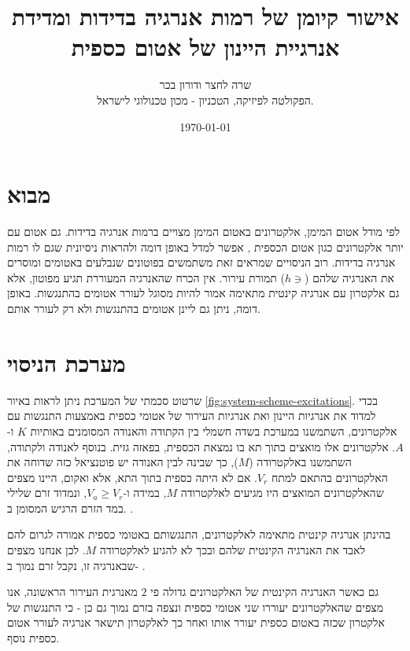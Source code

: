 \documentclass{article}
\title{
אישור קיומן של רמות אנרגיה בדידות ומדידת אנרגיית היינון של אטום כספית
}
\author{
שרה לחצר ודורון בכר \\
הפקולטה לפיזיקה, הטכניון - מכון טכנולוגי לישראל.
}
\date{\today}
\newcommand*\circled[1]{\tikz[baseline=(char.base)]{
		            \node[shape=circle,draw,inner sep=1pt] (char) {#1};}}
\begin{document}
\maketitle

\begin{abstract}
\end{abstract}

\section{מבוא}

לפי מודל אטום המימן, אלקטרונים באטום המימן מצויים ברמות אנרגיה בדידות. גם אטום
עם יותר אלקטרונים כגון אטום הכספית , אפשר למדל באופן דומה ולהראות
ניסיונית שגם לו רמות אנרגיה בדידות. רוב הניסויים שמראים זאת משתמשים בפוטונים
שנבלעים באטומים ומוסרים את האנרגיה שלהם ($h \ni$) תמורת עירור. אין הכרח
שהאנרגיה המעוררת תגיע מפוטון, אלא גם אלקטרון עם אנרגיה קינטית מתאימה אמור להיות
מסוגל לעורר אטומים בהתנגשות. באופן דומה, ניתן גם ליינן אטומים בהתנגשות ולא רק
לעורר אותם.


\section{מערכת הניסוי}

שרטוט סכמתי של המערכת ניתן לראות באיור \ref{fig:system-scheme-excitations}.
בכדי למדוד את אנרגיות היינון ואת אנרגיות העירור של אטומי כספית באמצעות התנגשות
עם אלקטרונים, השתמשנו במערכת בשדה חשמלי בין הקתודה והאנודה המסומנים באותיות $K$
ו-$A$. אלקטרונים אלו מואצים בתוך תא בו נמצאת הכספית, בפאזה גזית. בנוסף לאנודה
ולקתודה, השתמשנו באלקטרודה ($M$), כך שבינה לבין האנודה יש פוטנציאל כזה שדוחה את
האלקטרונים בהתאם למתח $V_r$. אם לא היתה כספית בתוך התא, אלא ואקום, היינו מצפים
שהאלקטרונים המואצים היו מגיעים לאלקטרודה $M$, במידה ו-$V_a \ge  V_r$, ונמדוד
זרם שלילי במד הזרם הרגיש המסומן ב.
\circled{pA}.

בהינתן אנרגיה קינטית מתאימה לאלקטרונים, התנגשותם באטומי כספית אמורה לגרום להם
לאבד את האנרגיה הקינטית שלהם ובכך לא להגיע לאלקטרודה $M$. לכן אנחנו מצפים
שבאנרגיה זו, נקבל זרם נמוך ב-
\circled{pA}.

גם כאשר האנרגיה הקינטית של האלקטרונים גדולה פי
$2$
מאנרגית העירור הראשונה, אנו מצפים שהאלקטרונים יעוררו שני אטומי כספית ונצפה בזרם נמוך גם כן - כי התנגשות של אלקטרון שכזה באטום כספית יעורר אותו ואחר כך לאלקטרון תישאר אנרגיה לעורר אטום כספית נוסף. 
\end{document}
